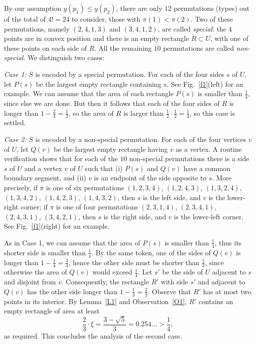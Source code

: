 \documentclass[11pt]{article}
\begin{document}
By our assumption $y(p_1) \leq y(p_2)$, there are only $12$
permutations (types) out of the total of $4! = 24$ to consider, those with
$\pi(1)<\pi(2)$. 
Two of these permutations, namely $(2,4,1,3)$ and $(3,4,1,2)$, are
called {\em special}: the $4$ points are in convex position and there
is an empty rectangle $R \subset U$, with one of these points on each side of
$R$. All the remaining $10$ permutations are called {\em non-special}.
We distinguish two cases: 

\medskip
{\em Case 1:} $S$ is encoded by a special permutation.
For each of the four sides $s$ of $U$, let $P(s)$ be the largest
empty rectangle containing $s$.
See Fig.~\ref{f1}(left) for an example. 
We can assume that the area of each rectangle 
$P(s)$ is smaller than $\frac{1}{4}$, since else we are done. But then it
follows that each of the four sides of $R$ is longer than 
$1-\frac{2}{4}=\frac{1}{2}$, so the area
of $R$ is larger than $\frac{1}{2} \cdot \frac{1}{2} = \frac{1}{4}$,
so this case is settled.

\medskip
{\em Case 2:} $S$ is encoded by a non-special permutation.
For each of the four vertices $v$ of $U$, let $Q(v)$ be the largest
empty rectangle having $v$ as a vertex. A routine verification shows that for
each of the $10$ non-special permutations there is a side $s$ of $U$
and a vertex $v$ of $U$ such that (i) $P(s)$ and $Q(v)$ have a common
boundary segment, and (ii) $v$ is an endpoint of the side opposite to $s$.
More precisely,
if $\pi$ is one of six permutations
$(1,2,3,4)$, $(1,2,4,3)$, $(1,3,2,4)$, 
$(1,3,4,2)$, $(1,4,2,3)$, $(1,4,3,2)$, 
then $s$ is the left side, and $v$ is the lower-right corner;
if $\pi$ is one of four permutations
$(2,3,1,4)$, $(2,3,4,1)$, $(2,4,3,1)$, $(3,4,2,1)$, 
then $s$ is the right side, and $v$ is the lower-left corner. 
See Fig.~\ref{f1}(right) for an example. 

As in Case 1, we can assume that
the area of $P(s)$ is smaller than $\frac{1}{4}$, thus its shorter side
is smaller than $\frac{1}{4}$. By the same token, one of the sides of $Q(v)$ 
is longer than $1-\frac{1}{4}=\frac{3}{4}$, hence the other side must
be shorter than $\frac{1}{3}$, 
since otherwise the area of $Q(v)$ would exceed $\frac{1}{4}$.
Let $s'$ be the side of $U$ adjacent to $s$ and disjoint from $v$.
Consequently, the rectangle $R'$ with side $s'$ and adjacent to $Q(v)$
has the other side longer than $1-\frac{1}{3}=\frac{2}{3}$. Observe
that $R'$ has at most two points in its interior. By Lemma~\ref{L1}
and Observation~\ref{O1}, $R'$ contains an empty rectangle of area at
least 
$$ \frac{2}{3} \cdot \xi =\frac{3-\sqrt{5}}{3} = 0.254\ldots > \frac{1}{4}, $$
as required. This concludes the analysis of the second case.
\end{document}
